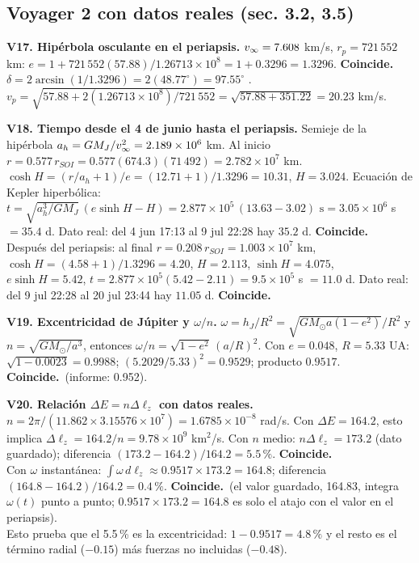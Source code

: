 \documentclass[11pt,letterpaper]{article}
\newcommand{\ok}{\textbf{Coincide.}\ }
\begin{document}
\subsection*{Voyager 2 con datos reales (sec. 3.2, 3.5)}
\textbf{V17. Hipérbola osculante en el periapsis.} $v_\infty=7.608$ km/s, $r_p=721\,552$ km: $e=1+721\,552(57.88)/1.26713\times10^8=1+0.3296=1.3296$. \ok $\delta=2\arcsin(1/1.3296)=2(48.77^\circ)=97.55^\circ$ . $v_p=\sqrt{57.88+2(1.26713\times10^8)/721\,552}=\sqrt{57.88+351.22}=20.23$ km/s.

\textbf{V18. Tiempo desde el 4 de junio hasta el periapsis.} Semieje de la hipérbola $a_h=GM_J/v_\infty^2=2.189\times10^6$ km. Al inicio $r=0.577\,r_{SOI}=0.577(674.3)(71\,492)=2.782\times10^7$ km. $\cosh H=(r/a_h+1)/e=(12.71+1)/1.3296=10.31$, $H=3.024$. Ecuación de Kepler hiperbólica: $t=\sqrt{a_h^3/GM_J}\,(e\sinh H-H)=2.877\times10^5\,(13.63-3.02)\text{ s}=3.05\times10^6$ s $=35.4$ d. Dato real: del 4 jun 17:13 al 9 jul 22:28 hay $35.2$ d. \ok\\
Después del periapsis: al final $r=0.208\,r_{SOI}=1.003\times10^7$ km, $\cosh H=(4.58+1)/1.3296=4.20$, $H=2.113$, $\sinh H=4.075$, $e\sinh H=5.42$, $t=2.877\times10^5(5.42-2.11)=9.5\times10^5$ s $=11.0$ d. Dato real: del 9 jul 22:28 al 20 jul 23:44 hay $11.05$ d. \ok

\textbf{V19. Excentricidad de Júpiter y $\omega/n$.} $\omega=h_J/R^2=\sqrt{GM_\odot a(1-e^2)}/R^2$ y $n=\sqrt{GM_\odot/a^3}$, entonces $\omega/n=\sqrt{1-e^2}\,(a/R)^2$. Con $e=0.048$, $R=5.33$ UA: $\sqrt{1-0.0023}=0.9988$; $(5.2029/5.33)^2=0.9529$; producto $0.9517$. \ok (informe: 0.952).

\textbf{V20. Relación $\Delta E=n\Delta\ell_z$ con datos reales.} $n=2\pi/(11.862\times3.15576\times10^7)=1.6785\times10^{-8}$ rad/s. Con $\Delta E=164.2$, esto implica $\Delta\ell_z=164.2/n=9.78\times10^9$ km$^2$/s. Con $n$ medio: $n\Delta\ell_z=173.2$ (dato guardado); diferencia $(173.2-164.2)/164.2=5.5\,\%$. \ok\\
Con $\omega$ instantánea: $\int\omega\,d\ell_z\approx0.9517\times173.2=164.8$; diferencia $(164.8-164.2)/164.2=0.4\,\%$. \ok (el valor guardado, 164.83, integra $\omega(t)$ punto a punto; $0.9517\times173.2=164.8$ es solo el atajo con el valor en el periapsis).\\
Esto prueba que el 5.5\,\% es la excentricidad: $1-0.9517=4.8\,\%$ y el resto es el término radial ($-0.15$) más fuerzas no incluidas ($-0.48$).
\end{document}
